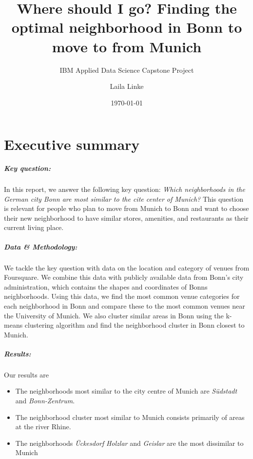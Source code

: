 \documentclass[UKenglish]{scrreprt}
\title{Where should I go? Finding the optimal neighborhood in Bonn to move to from Munich}
\subtitle{IBM Applied Data Science Capstone Project}
\author{Laila Linke}
\date{\today}
\begin{document}
\maketitle


\chapter*{Executive summary}

\paragraph{Key question:}In this report, we answer the following key question: \emph{Which neighborhoods in the German city Bonn are most similar to the cite center of Munich?} This question is relevant for people who plan to move from Munich to Bonn and want to choose their new neighborhood to have similar stores, amenities, and restaurants as their current living place. 

\paragraph{Data \& Methodology:} We tackle the key question with data on the location and category of venues from Foursquare. We combine this data with publicly available data from Bonn's city administration, which contains the shapes and coordinates of Bonns neighborhoods. Using this data, we find the most common venue categories for each neighborhood in Bonn and compare these to the most common venues near the University of Munich. We also cluster similar areas in Bonn using the k-means clustering algorithm and find the neighborhood cluster in Bonn closest to Munich. 

\paragraph{Results:}Our results are
\begin{itemize}
	\item The neighborhoods most similar to the city centre of Munich are \emph{Südstadt} and \emph{Bonn-Zentrum}.
	\item The neighborhood cluster most similar to Munich consists primarily of areas at the river Rhine.
	\item The neighborhoods \emph{Ückesdorf} \emph{Holzlar} and \emph{Geislar} are the most dissimilar to Munich
\end{itemize}
%
\end{document}
